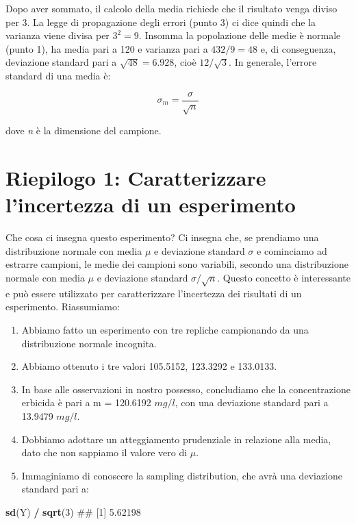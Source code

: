 \documentclass[a4paper,12pt,oneside]{book}
\providecommand{\tightlist}{%
  \setlength{\itemsep}{0pt}\setlength{\parskip}{0pt}}
\newenvironment{Shaded}{\begin{snugshade}}{\end{snugshade}}
\newcommand{\KeywordTok}[1]{\textcolor[rgb]{0.13,0.29,0.53}{\textbf{#1}}}
\newcommand{\DecValTok}[1]{\textcolor[rgb]{0.00,0.00,0.81}{#1}}
\newcommand{\StringTok}[1]{\textcolor[rgb]{0.31,0.60,0.02}{#1}}
\newcommand{\OperatorTok}[1]{\textcolor[rgb]{0.81,0.36,0.00}{\textbf{#1}}}
\newcommand{\NormalTok}[1]{#1}
\theoremstyle{definition}
\theoremstyle{definition}
\theoremstyle{definition}
\theoremstyle{remark}
\begin{document}
Dopo aver sommato, il calcolo della media richiede che il risultato
venga diviso per 3. La legge di propagazione degli errori (punto 3) ci
dice quindi che la varianza viene divisa per \(3^2 = 9\). Insomma la
popolazione delle medie è normale (punto 1), ha media pari a 120 e
varianza pari a \(432/9 = 48\) e, di conseguenza, deviazione standard
pari a \(\sqrt{48} = 6.928\), cioè \(12/\sqrt{3}\). In generale,
l'errore standard di una media è:

\[\sigma_m  = \frac{\sigma }{\sqrt n }\]

dove \emph{n} è la dimensione del campione.

\section{Riepilogo 1: Caratterizzare l'incertezza di un
esperimento}\label{riepilogo-1-caratterizzare-lincertezza-di-un-esperimento}

Che cosa ci insegna questo esperimento? Ci insegna che, se prendiamo una
distribuzione normale con media \(\mu\) e deviazione standard \(\sigma\)
e cominciamo ad estrarre campioni, le medie dei campioni sono variabili,
secondo una distribuzione normale con media \(\mu\) e deviazione
standard \(\sigma / \sqrt{n}\). Questo concetto è interessante e può
essere utilizzato per caratterizzare l'incertezza dei risultati di un
esperimento. Riassumiamo:

\begin{enumerate}
\def\labelenumi{\arabic{enumi}.}
\tightlist
\item
  Abbiamo fatto un esperimento con tre repliche campionando da una
  distribuzione normale incognita.
\item
  Abbiamo ottenuto i tre valori 105.5152, 123.3292 e 133.0133.
\item
  In base alle osservazioni in nostro possesso, concludiamo che la
  concentrazione erbicida è pari a m = 120.6192 \(mg/l\), con una
  deviazione standard pari a 13.9479 \(mg/l\).
\item
  Dobbiamo adottare un atteggiamento prudenziale in relazione alla
  media, dato che non sappiamo il valore vero di \(\mu\).
\item
  Immaginiamo di conoscere la sampling distribution, che avrà una
  deviazione standard pari a:
\end{enumerate}

\begin{Shaded}
\begin{Highlighting}[]
\KeywordTok{sd}\NormalTok{(Y) }\OperatorTok{/}\StringTok{ }\KeywordTok{sqrt}\NormalTok{(}\DecValTok{3}\NormalTok{)}
\NormalTok{## [1] 5.62198}
\end{Highlighting}
\end{Shaded}
\end{document}
